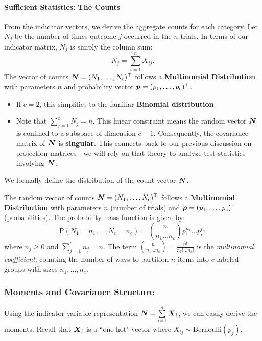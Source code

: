 \paragraph{Sufficient Statistics: The Counts}
From the indicator vectors, we derive the aggregate counts for each category. Let $N_j$ be the number of times outcome $j$ occurred in the $n$ trials.
In terms of our indicator matrix, $N_j$ is simply the column sum:
\[
    N_j = \sum_{i=1}^{n} X_{ij}.
\]
The vector of counts $\boldsymbol{N} = (N_1, \dots, N_c)^\top$ follows a \textbf{Multinomial Distribution} with parameters $n$ and probability vector $\boldsymbol{p} = (p_1, \dots, p_c)^\top$.
\begin{itemize}
    \item If $c=2$, this simplifies to the familiar \textbf{Binomial distribution}.
    \item Note that $\sum_{j=1}^c N_j = n$. This linear constraint means the random vector $\boldsymbol{N}$ is confined to a subspace of dimension $c-1$. Consequently, the covariance matrix of $\boldsymbol{N}$ is \textbf{singular}. This connects back to our previous discussion on projection matrices—we will rely on that theory to analyze test statistics involving $\boldsymbol{N}$.
\end{itemize}

We formally define the distribution of the count vector $\boldsymbol{N}$.

\begin{definition}
    The random vector of counts $\boldsymbol{N} = (N_1, \dots, N_c)^\top$ follows a \textbf{Multinomial Distribution} with parameters $n$ (number of trials) and $\boldsymbol{p} = (p_1, \dots, p_c)^\top$ (probabilities).
    The probability mass function is given by:
    \[
        \mathsf{P}(N_1 = n_1, \dots, N_c = n_c) = \binom{n}{n_1 \dots n_c} p_1^{n_1} \dots p_c^{n_c}
    \]
    where $n_j \ge 0$ and $\sum\limits_{j=1}^c n_j = n$.
    The term $\binom{n}{n_1 \dots n_c} = \frac{n!}{n_1! \dots n_c!}$ is the \textit{multinomial coefficient}, counting the number of ways to partition $n$ items into $c$ labeled groups with sizes $n_1, \dots, n_c$.
\end{definition}



\subsubsection{Moments and Covariance Structure}

Using the indicator variable representation $\boldsymbol{N} = \sum\limits_{i=1}^n \boldsymbol{X}_i$, we can easily derive the moments. Recall that $\boldsymbol{X}_i$ is a ``one-hot" vector where $X_{ij} \sim \text{Bernoulli}(p_j)$.

